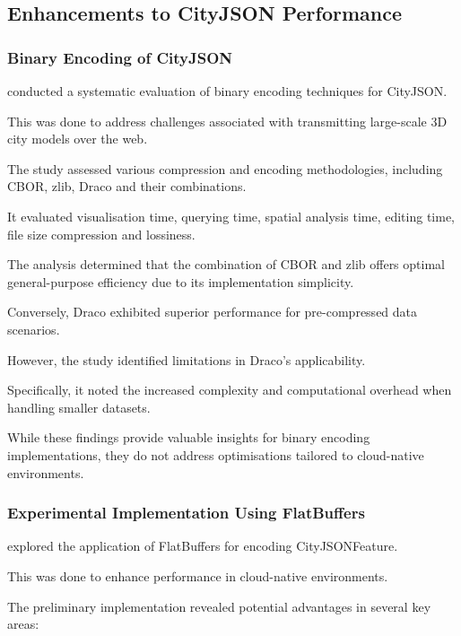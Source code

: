 \subsection{Enhancements to CityJSON Performance}
\label{rw:cityjson_enhancements:performance}

\subsubsection{Binary Encoding of CityJSON}
\label{rw:cityjson_enhancements:performance:binary_encoding}

\citet{jordi_van_liempt_2020} conducted a systematic evaluation of binary encoding techniques for CityJSON.

This was done to address challenges associated with transmitting large-scale 3D city models over the web.

The study assessed various compression and encoding methodologies, including CBOR, zlib, Draco and their combinations.

It evaluated visualisation time, querying time, spatial analysis time, editing time, file size compression and lossiness.

The analysis determined that the combination of CBOR and zlib offers optimal general-purpose efficiency due to its implementation simplicity.

Conversely, Draco exhibited superior performance for pre-compressed data scenarios.

However, the study identified limitations in Draco's applicability.

Specifically, it noted the increased complexity and computational overhead when handling smaller datasets.

While these findings provide valuable insights for binary encoding implementations, they do not address optimisations tailored to cloud-native environments.

\subsubsection{Experimental Implementation Using FlatBuffers}
\label{rw:cityjson_enhancements:performance:flatbuffers}

\citet{ravi_peters_2024_citybuf} explored the application of FlatBuffers \citep{flatbuffers} for encoding CityJSONFeature.

This was done to enhance performance in cloud-native environments.

The preliminary implementation revealed potential advantages in several key areas:


